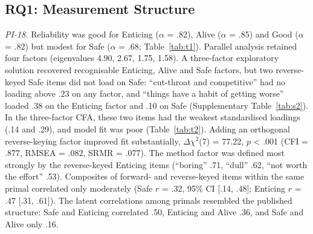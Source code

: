 \documentclass[journal,a4paper]{IEEEtran}
\begin{document}
\subsection{RQ1: Measurement Structure}

\textit{PI-18.} Reliability was good for Enticing ($\alpha$ = .82), Alive ($\alpha$ = .85) and Good ($\alpha$ = .82) but modest for Safe ($\alpha$ = .68; Table~\ref{tab:t1}). Parallel analysis retained four factors (eigenvalues 4.90, 2.67, 1.75, 1.58). A three-factor exploratory solution recovered recognisable Enticing, Alive and Safe factors, but two reverse-keyed Safe items did not load on Safe: ``cut-throat and competitive'' had no loading above .23 on any factor, and ``things have a habit of getting worse'' loaded .38 on the Enticing factor and .10 on Safe (Supplementary Table~\ref{tab:s2}). In the three-factor CFA, these two items had the weakest standardised loadings (.14 and .29), and model fit was poor (Table~\ref{tab:t2}). Adding an orthogonal reverse-keying factor improved fit substantially, $\Delta \chi ^2$(7) = 77.22, $p$ < .001 (CFI = .877, RMSEA = .082, SRMR = .077). The method factor was defined most strongly by the reverse-keyed Enticing items (``boring'' .71, ``dull'' .62, ``not worth the effort'' .53). Composites of forward- and reverse-keyed items within the same primal correlated only moderately (Safe $r$ = .32, 95\% CI [.14, .48]; Enticing $r$ = .47 [.31, .61]). The latent correlations among primals resembled the published structure: Safe and Enticing correlated .50, Enticing and Alive .36, and Safe and Alive only .16.
\end{document}
